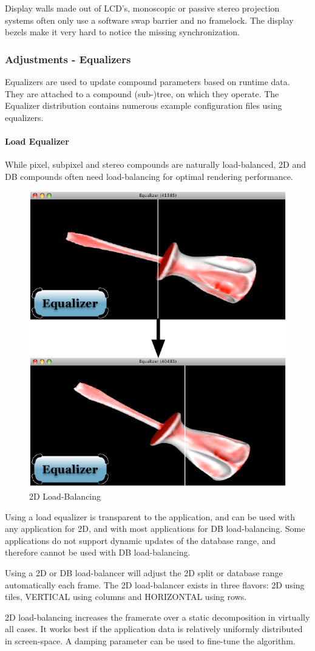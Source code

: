 \documentclass[10pt,a4]{scrartcl}
\begin{document}
Display walls made out of LCD's, monoscopic or passive stereo projection systems
often only use a software swap barrier and no framelock. The display bezels make
it very hard to notice the missing synchronization.

\subsubsection{\label{sEqualizers}Adjustments - Equalizers}

Equalizers are used to update compound parameters based on runtime
data. They are attached to a compound (sub-)tree, on which they
operate. The Equalizer distribution contains numerous example
configuration files using equalizers.

\paragraph{Load Equalizer}
While pixel, subpixel and stereo compounds are naturally load-balanced, 2D and
DB compounds often need load-balancing for optimal rendering performance.

\begin{figure}
  \includegraphics[width=.382\textwidth]{images/lb.pdf}
  {\caption{\label{fLoadBalancing}\small 2D Load-Balancing}}
\end{figure}
Using a load equalizer is transparent to the application, and can be used with
any application for 2D, and with most applications for DB load-balancing. Some
applications do not support dynamic updates of the database range, and therefore
cannot be used with DB load-balancing.

Using a 2D or DB load-balancer will adjust the 2D split or database range
automatically each frame. The 2D load-balancer exists in three flavors:
\textsf{2D} using tiles, \textsf{VERTICAL} using columns and
\textsf{HORIZONTAL} using rows.

2D load-balancing increases the framerate over a static decomposition in
virtually all cases. It works best if the application data is relatively
uniformly distributed in screen-space. A damping parameter can be used
to fine-tune the algorithm.
\end{document}
